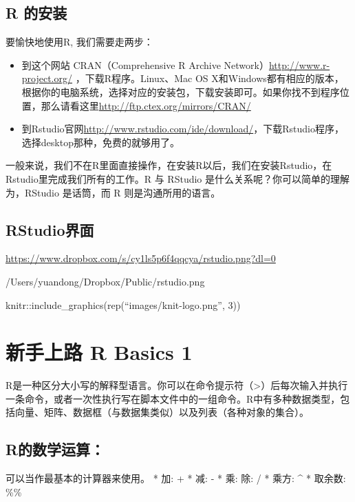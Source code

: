 \documentclass[]{book}
\begin{document}
\hypertarget{r-}{%
\section{R 的安装}\label{r-}}

要愉快地使用R, 我们需要走两步：

\begin{itemize}
\item
  到这个网站 CRAN（Comprehensive R Archive
  Network）\url{http://www.r-project.org/} ，下载R程序。Linux、Mac OS
  X和Windows都有相应的版本，根据你的电脑系统，选择对应的安装包，下载安装即可。如果你找不到程序位置，那么请看这里\url{http://ftp.ctex.org/mirrors/CRAN/}
\item
  到Rstudio官网\url{http://www.rstudio.com/ide/download/}，下载Rstudio程序，选择desktop那种，免费的就够用了。
\end{itemize}

一般来说，我们不在R里面直接操作，在安装R以后，我们在安装Rstudio，在Rstudio里完成我们所有的工作。R
与 RStudio 是什么关系呢？你可以简单的理解为，RStudio 是话筒，而 R
则是沟通所用的语言。

\hypertarget{rstudio}{%
\section{RStudio界面}\label{rstudio}}

\url{https://www.dropbox.com/s/cy1ls5p6f4qqcya/rstudio.png?dl=0}

/Users/yuandong/Dropbox/Public/rstudio.png

knitr::include\_graphics(rep(``images/knit-logo.png'', 3))

\hypertarget{-r-basics-1}{%
\chapter{新手上路 R Basics 1}\label{-r-basics-1}}

R是一种区分大小写的解释型语言。你可以在命令提示符（\textgreater{}）后每次输入并执行一条命令，或者一次性执行写在脚本文件中的一组命令。R中有多种数据类型，包括向量、矩阵、数据框（与数据集类似）以及列表（各种对象的集合）。

\hypertarget{r}{%
\section{R的数学运算：}\label{r}}

可以当作最基本的计算器来使用。 * 加: + * 减: - * 乘: \emph{ } 除: / *
乘方: \^{} * 取余数: \%\%
\end{document}
